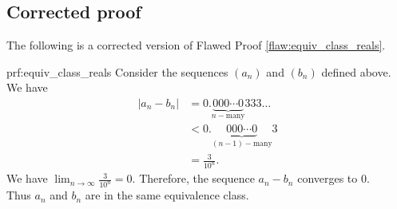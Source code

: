 \clearpage
\subsection{Corrected proof}

The following is a corrected version of Flawed Proof \ref{flaw:equiv_class_reals}. %

\begin{prf}{prf:equiv_class_reals} %
Consider the sequences $(a_n)$ and $(b_n)$ defined above.
We have
\begin{align*}
    |a_n - b_n| &= 0.\underbrace{000\cdots0}_{n-\text{many}}333\ldots \\
    &< 0.\underbrace{000\cdots0}_{(n-1)-\text{many}}3 \\
    &=\frac{3}{10^n}.
\end{align*}
We have $\displaystyle\lim_{n\rightarrow\infty} \frac{3}{10^n} =0$. Therefore, the sequence $a_n-b_n$ converges to 0. \\

\noindent Thus $a_n$ and $b_n$ are in the same equivalence class.
\end{prf}
